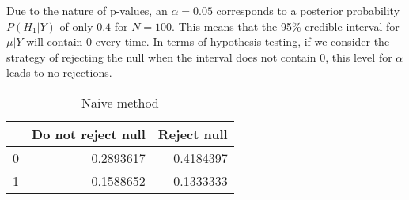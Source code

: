 \documentclass[12pt,twoside]{dukestatscithesis}
\theoremstyle{definition}
\theoremstyle{definition}
\theoremstyle{definition}
\theoremstyle{remark}
\begin{document}
Due to the nature of p-values, an \(\alpha = 0.05\) corresponds to a
posterior probability \(P(H_1 | Y )\) of only \(0.4\) for \(N = 100\).
This means that the 95\% credible interval for \(\mu| Y\) will contain 0
every time. In terms of hypothesis testing, if we consider the strategy
of rejecting the null when the interval does not contain 0, this level
for \(\alpha\) leads to no rejections.
\begin{Shaded}
\begin{Highlighting}[]
\NormalTok{(}\OperatorTok{$}\OperatorTok{$}\OperatorTok{/}\NormalTok{(}\OperatorTok{/}\NormalTok{)}\OperatorTok{<}\NormalTok{(}\OperatorTok{-}\OperatorTok{/}\NormalTok{))}\OperatorTok{/}\NormalTok{(results)[}\NormalTok{], } \NormalTok{(}\NormalTok{, }\NormalTok{), } \NormalTok{, } \NormalTok{)}
\end{Highlighting}
\end{Shaded}
\begin{table}

\caption{\label{tab:unnamed-chunk-8}Naive method}
\centering
\begin{tabular}[t]{l|r|r}
\hline
  & Do not reject null & Reject null\\
\hline
0 & 0.2893617 & 0.4184397\\
\hline
1 & 0.1588652 & 0.1333333\\
\hline
\end{tabular}
\end{table}
\begin{Shaded}
\begin{Highlighting}[]
\NormalTok{(}\OperatorTok{$}\OperatorTok{$}\OperatorTok{>=}\OperatorTok{&}\OperatorTok{$}\OperatorTok{<=}\NormalTok{)}\OperatorTok{/}\NormalTok{(results)[}\NormalTok{], } \NormalTok{(}\NormalTok{), } \NormalTok{, } \NormalTok{)}
\end{Highlighting}
\end{Shaded}
\end{document}
